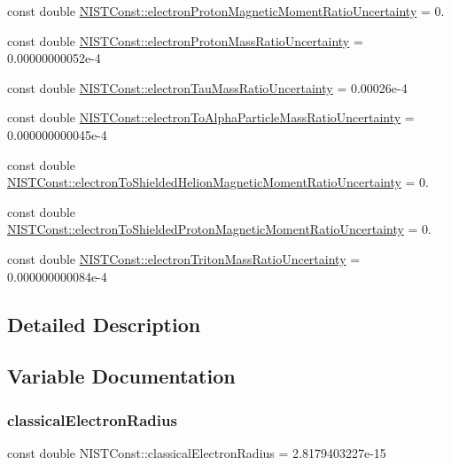 \begin{DoxyCompactItemize}
const double \hyperlink{group___electron_ga1ffa85ab2921b18e02e1e4bb9584c597}{N\+I\+S\+T\+Const\+::electron\+Proton\+Magnetic\+Moment\+Ratio\+Uncertainty} = 0.
\item 
const double \hyperlink{group___electron_gaa6a62a5a0190d5554ffbc63abe98b4ab}{N\+I\+S\+T\+Const\+::electron\+Proton\+Mass\+Ratio\+Uncertainty} = 0.\+00000000052e-\/4
\item 
const double \hyperlink{group___electron_ga1550ca2fa257e862b364df16feb6b0ca}{N\+I\+S\+T\+Const\+::electron\+Tau\+Mass\+Ratio\+Uncertainty} = 0.\+00026e-\/4
\item 
const double \hyperlink{group___electron_gada80eb52952da33c11f6daa11cc0813b}{N\+I\+S\+T\+Const\+::electron\+To\+Alpha\+Particle\+Mass\+Ratio\+Uncertainty} = 0.\+000000000045e-\/4
\item 
const double \hyperlink{group___electron_ga79766e2a2ad98bf3fe7e38271ad826a4}{N\+I\+S\+T\+Const\+::electron\+To\+Shielded\+Helion\+Magnetic\+Moment\+Ratio\+Uncertainty} = 0.
\item 
const double \hyperlink{group___electron_ga334eecd21a41f4c879792b187b949946}{N\+I\+S\+T\+Const\+::electron\+To\+Shielded\+Proton\+Magnetic\+Moment\+Ratio\+Uncertainty} = 0.
\item 
const double \hyperlink{group___electron_ga424cccf2b6f72fd447313bac0994029e}{N\+I\+S\+T\+Const\+::electron\+Triton\+Mass\+Ratio\+Uncertainty} = 0.\+000000000084e-\/4
\end{DoxyCompactItemize}


\subsection{Detailed Description}


\subsection{Variable Documentation}
\mbox{\label{group___electron_gac67d6a01d8d75cb66290a36f7123942b}} 
\subsubsection{\texorpdfstring{classical\+Electron\+Radius}{classicalElectronRadius}}
{\footnotesize\ttfamily const double N\+I\+S\+T\+Const\+::classical\+Electron\+Radius = 2.\+8179403227e-\/15}

